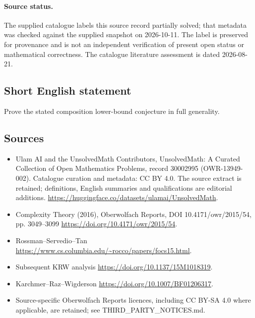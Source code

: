 \documentclass[11pt]{article}
\begin{document}
\paragraph{Source status.}
The supplied catalogue labels this source record partially solved; that metadata was checked against the supplied snapshot on 2026-10-11. The label is preserved for provenance and is not an independent verification of present open status or mathematical correctness. The catalogue literature assessment is dated 2026-08-21.
\subsection{Short English statement}
Prove the stated composition lower-bound conjecture in full generality.
\subsection{Sources}
\begin{itemize}
\item[\hypertarget{source:30002995:1}{S1}] Ulam AI and the UnsolvedMath Contributors, UnsolvedMath: A Curated Collection of Open Mathematics Problems, record 30002995 (OWR-13949-002). Catalogue curation and metadata: CC BY 4.0. The source extract is retained; definitions, English summaries and qualifications are editorial additions.
\url{https://huggingface.co/datasets/ulamai/UnsolvedMath}.
\item[\hypertarget{source:30002995:2}{S2}] Complexity Theory (2016), Oberwolfach Reports, DOI 10.4171/owr/2015/54, pp. 3049--3099
\url{https://doi.org/10.4171/owr/2015/54}.
\item[\hypertarget{source:30002995:3}{S3}] Rossman--Servedio--Tan
\url{https://www.cs.columbia.edu/~rocco/papers/focs15.html}.
\item[\hypertarget{source:30002995:4}{S4}] Subsequent KRW analysis
\url{https://doi.org/10.1137/15M1018319}.
\item[\hypertarget{source:30002995:5}{S5}] Karchmer--Raz--Wigderson
\url{https://doi.org/10.1007/BF01206317}.
\item Source-specific Oberwolfach Reports licences, including CC BY-SA 4.0 where applicable, are retained; see THIRD\_PARTY\_NOTICES.md.
\end{itemize}
\end{document}
